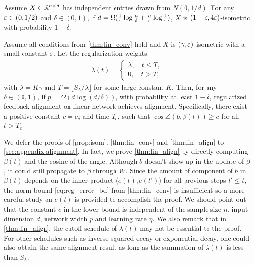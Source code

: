 \begin{proposition}
\label{prop:isom}
Assume $X\in\mathbb{R}^{n\times d}$ has independent entries drawn from $N(0,1/d)$. For any $\varepsilon \in (0,1/2)$ and $\delta \in (0,1)$, if $d=\Omega(\frac{1}{\varepsilon}\log\frac{n}{\delta}+\frac{n}{\varepsilon}\log \frac{1}{\varepsilon})$, $X$ is $(1-\varepsilon, 4\varepsilon)$-isometric with probability $1-\delta$.
\end{proposition}

\begin{theorem}
\label{thm:lin_align}
Assume all conditions from \cref{thm:lin_conv} hold and $X$ is $(\gamma, \varepsilon)$-isometric with a small constant $\varepsilon$. Let the regularization weights
\begin{align*}
\lambda(t) = 
\begin{cases}
    \lambda, \quad t\leq T,\\
    0, \quad t > T,
\end{cases}
\end{align*}
with $\lambda=K\gamma$ and $T = \lfloor S_\lambda/\lambda\rfloor$ for some large constant $K$. Then, for any $\delta\in(0,1)$, if $p = \Omega(d\log(d/\delta))$, with probability at least $1-\delta$, regularized feedback alignment on linear network achieves alignment. Specifically, there exist a positive constant $c=c_\delta$ and time $T_c$, such that $\cos\angle(b, \beta(t))\geq c$ for all $t>T_c$.
\end{theorem}

We defer the proofs of \cref{prop:isom}, \cref{thm:lin_conv} and \cref{thm:lin_align} to \cref{sec:appendix-alignment}. In fact, we prove \cref{thm:lin_align} by directly computing $\beta(t)$ and the cosine of the angle. Although $b$ doesn't show up in the update of $\beta$, it could still propagate to $\beta$ through $W$. Since the amount of component of $b$ in $\beta(t)$ depends on the inner-product $\langle e(t), e(t')\rangle$ for all previous steps $t'\leq t$, the norm bound \eqref{eq:reg_error_bd} from \cref{thm:lin_conv} is insufficient so a more careful study on $e(t)$ is provided to accomplish the proof. We should point out that the constant $c$ in the lower bound is independent of the sample size $n$, input dimension $d$, network width $p$ and learning rate $\eta$. We also remark that in \cref{thm:lin_align}, the cutoff schedule of $\lambda(t)$ may not be essential to the proof. For other schedules such as inverse-squared decay or exponential decay, one could also obtain the same alignment result as long as the summation of $\lambda(t)$ is less than $S_\lambda$.

